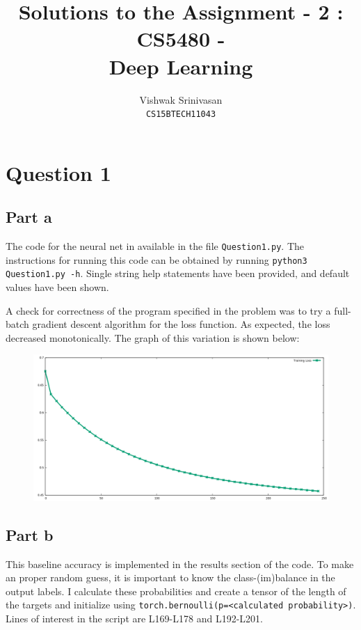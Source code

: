 \documentclass{article}
\title{Solutions to the Assignment - 2 : CS5480 - \\
Deep Learning}
\author{Vishwak Srinivasan\\
\texttt{CS15BTECH11043}}
\date{}
\begin{document}
\maketitle

\section*{Question 1}
\subsection*{Part a}
\begin{flushleft}
The code for the neural net in available in the file \texttt{Question1.py}. The instructions for running this code can be obtained by running \texttt{python3 Question1.py -h}. Single string help statements have been provided, and default values have been shown.

A check for correctness of the program specified in the problem was to try a full-batch gradient descent algorithm for the loss function. As expected, the loss decreased monotonically. The graph of this variation is shown below:
\begin{figure}[H]
\centering
\includegraphics[width=0.7\linewidth]{train_full_batch_q1.png}
\end{figure}
\end{flushleft}

\subsection*{Part b}
\begin{flushleft}
This baseline accuracy is implemented in the results section of the code. To make an proper random guess, it is important to know the class-(im)balance in the output labels. I calculate these probabilities and create a tensor of the length of the targets and initialize using \texttt{torch.bernoulli(p=<calculated probability>)}. Lines of interest in the script are L169-L178 and L192-L201.
\end{flushleft}
\end{document}
